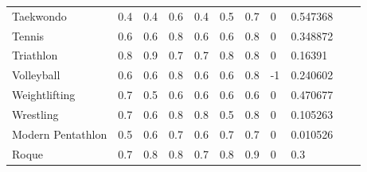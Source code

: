 \documentclass[a4paper]{article}
\begin{document}
\begin{table}[h]
\begin{tabular}{|l|lllllll|l|ll}
    Taekwondo                                   & \multicolumn{1}{l|}{0.4}      & \multicolumn{1}{l|}{0.4}      & \multicolumn{1}{l|}{0.6}  & \multicolumn{1}{l|}{0.4}  & \multicolumn{1}{l|}{0.5}  & \multicolumn{1}{l|}{0.7}      & 0                       & 0.547368                                               &  &  \\ \cline{1-9}
    Tennis                                      & \multicolumn{1}{l|}{0.6}      & \multicolumn{1}{l|}{0.6}      & \multicolumn{1}{l|}{0.8}  & \multicolumn{1}{l|}{0.6}  & \multicolumn{1}{l|}{0.6}  & \multicolumn{1}{l|}{0.8}      & 0                       & 0.348872                                               &  &  \\ \cline{1-9}
    Triathlon                                   & \multicolumn{1}{l|}{0.8}      & \multicolumn{1}{l|}{0.9}      & \multicolumn{1}{l|}{0.7}  & \multicolumn{1}{l|}{0.7}  & \multicolumn{1}{l|}{0.8}  & \multicolumn{1}{l|}{0.8}      & 0                       & 0.16391                                                &  &  \\ \cline{1-9}
    Volleyball                                  & \multicolumn{1}{l|}{0.6}      & \multicolumn{1}{l|}{0.6}      & \multicolumn{1}{l|}{0.8}  & \multicolumn{1}{l|}{0.6}  & \multicolumn{1}{l|}{0.6}  & \multicolumn{1}{l|}{0.8}      & -1                      & 0.240602                                               &  &  \\ \cline{1-9}
    Weightlifting                               & \multicolumn{1}{l|}{0.7}      & \multicolumn{1}{l|}{0.5}      & \multicolumn{1}{l|}{0.6}  & \multicolumn{1}{l|}{0.6}  & \multicolumn{1}{l|}{0.6}  & \multicolumn{1}{l|}{0.6}      & 0                       & 0.470677                                               &  &  \\ \cline{1-9}
    Wrestling                                   & \multicolumn{1}{l|}{0.7}      & \multicolumn{1}{l|}{0.6}      & \multicolumn{1}{l|}{0.8}  & \multicolumn{1}{l|}{0.8}  & \multicolumn{1}{l|}{0.5}  & \multicolumn{1}{l|}{0.8}      & 0                       & 0.105263                                               &  &  \\ \cline{1-9}
    Modern Pentathlon                           & \multicolumn{1}{l|}{0.5}      & \multicolumn{1}{l|}{0.6}      & \multicolumn{1}{l|}{0.7}  & \multicolumn{1}{l|}{0.6}  & \multicolumn{1}{l|}{0.7}  & \multicolumn{1}{l|}{0.7}      & 0                       & 0.010526                                               &  &  \\ \cline{1-9}
    Roque                                       & \multicolumn{1}{l|}{0.7}      & \multicolumn{1}{l|}{0.8}      & \multicolumn{1}{l|}{0.8}  & \multicolumn{1}{l|}{0.7}  & \multicolumn{1}{l|}{0.8}  & \multicolumn{1}{l|}{0.9}      & 0                       & 0.3                                                    &  &  \\ \cline{1-9}
    \end{tabular}
    \end{table}
\end{document}
